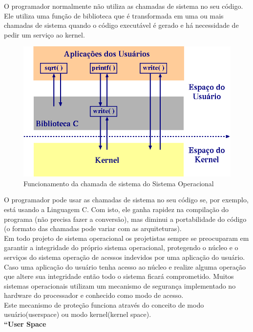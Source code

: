 \documentclass[12pt]{article}
\begin{document}
O programador normalmente não utiliza as chamadas de sistema no seu código. Ele utiliza uma função de biblioteca que é transformada em uma ou mais chamadas de sistema quando o código executável é gerado e há necessidade de pedir um serviço ao kernel.\\

\begin{figure}[H]
	\centering
	\includegraphics[scale=0.63]{img/syscall.png}
	\caption{Funcionamento da chamada de sistema do Sistema Operacional}
\end{figure}

O programador pode usar as chamadas de sistema no seu código se, por exemplo, está usando a Linguagem C. Com isto, ele ganha rapidez na compilação do programa (não precisa fazer a conversão), mas diminui a portabilidade do código (o formato das chamadas pode variar com as arquiteturas).\\

Em todo projeto de sistema operacional os projetistas sempre se preocuparam em garantir a integridade do próprio sistema operacional, protegendo o núcleo e o serviços do sistema operação de acessos indevidos por uma aplicação do usuário. Caso uma aplicação do usuário tenha acesso ao núcleo e realize alguma operação que altere sua integridade então todo o sistema ficará comprometido. Muitos sistemas operacionais utilizam um mecanismo de segurança implementado no hardware do processador e conhecido como modo de acesso.\\

Este mecanismo de proteção funciona através do conceito de modo usuário(userspace) ou modo kernel(kernel space).\\

\textbf{“User Space}\\
\end{document}
